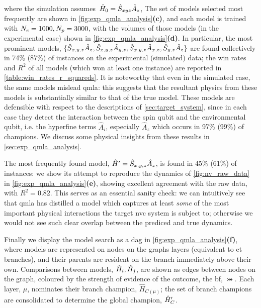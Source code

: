     where the simulation assumes\footnotemark \ $\hat{H}_0 = \hat{S}_{xyz} \hat{A}_z$, 
    The set of models selected most frequently are shown in \cref{fig:exp_qmla_analysis}\textbf{(c)},
    and each model is trained with $N_e=1000, N_p=3000$,
    with the \glspl{volume} of those models (in the experimental case) shown in  \cref{fig:exp_qmla_analysis}\textbf{(d)}.
In particular, the most prominent models, $\{ \hat{S}_{x,y,z}\hat{A}_{z}, \hat{S}_{x,y,z}\hat{A}_{y,z}, \hat{S}_{x,y,z}\hat{A}_{x,z}, \hat{S}_{y,z}\hat{A}_{z} \}$ are found collectively in 74\% (87\%)
    of instances on the experimental (simulated) data;
    the win rates and $R^2$ of all models (which won at least one instance) are reported in \cref{table:win_rates_r_squareds}. 
It is noteworthy that even in the simulated case, the same models mislead \gls{qmla}:
    this suggests that the resultant physics from these models is substantially similar to that of the true model\footnotemark. 
These models are defensible with respect to the descriptions of \cref{sec:target_system}, 
    since in each case they detect the interaction between the spin qubit and the environmental qubit, 
    i.e. the hyperfine terms $\hat{A}_i$, especially $\hat{A}_z$ which occurs in 97\% (99\%) of champions. 
We discuss some physical insights from these results in \cref{sec:exp_qmla_analysis}.   
\par 



The most frequently found model, $\hat{H}^{\prime} = \hat{S}_{x,y,z}\hat{A}_{z}$, is found in $45\%$ ($61\%$) of instances:
    we show its attempt to reproduce the dynamics of \cref{fig:nv_raw_data} in \cref{fig:exp_qmla_analysis}\textbf{(e)}, 
    showing excellent agreement with the raw data, with $R^2=0.82$. 
This serves as an essential sanity check: 
    we can intuitively see that \gls{qmla} has distilled a model which captures at least \emph{some} 
    of the most important physical interactions the target \gls{nvc} system is subject to; 
    otherwise we would not see such clear overlap between the prediced and true dynamics. 
\par 

Finally we display the model search as a \gls{dag} in \cref{fig:exp_qmla_analysis}\textbf{(f)}, 
    where models are represented on nodes on the graphs layers (equivalent to \gls{et} branches), 
    and their parents are resident on the branch immediately above their own.
Comparisons between models, $\hat{H}_i, \hat{H}_j$,  are shown as edges between nodes on the graph, 
    coloured by the strength of evidence of the outcome, the \gls{bf}, $\bij$. 
Each layer, $\mu$, nominates their branch champion, $\hat{H}_{C(\mu)}$;
    the set of branch champions are consolidated to determine the global champion, $\hat{H}^{\prime}_C$. 
